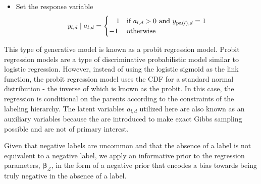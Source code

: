 \begin{enumerate}
\begin{itemize}
\begin{itemize}
\item Set the response variable \[
y_{l,d}\mid a_{l,d}=\begin{cases}
\ \ \ 1 & \text{if \ensuremath{a_{l,d}>0} and \ensuremath{y_{{\rm \mathrm{pa}}(l),d}=1}}\\
-1 & \text{otherwise}\end{cases}\]
 
\end{itemize}
\end{itemize}
\end{enumerate}
This type of generative model is known as a probit regression model.
Probit regression models are a type of discriminative probabilistic
model similar to logistic regression. However, instead of using the
logistic sigmoid as the link function, the probit regression model
uses the CDF for a standard normal distribution - the inverse of which
is known as the probit. In this case, the regression is conditional
on the parents according to the constraints of the labeling hierarchy.
The latent variables $a_{l,d}$ utilized here are also known as an
auxiliary variables because the are introduced to make exact Gibbs
sampling possible and are not of primary interest.

Given that negative labels are uncommon and that the absence of a
label is not equivalent to a negative label, we apply an informative
prior to the regression parameters, $\mathbf{\boldsymbol\beta}_{\mathcal{L}}$,
in the form of a negative prior that encodes a bias towards being
truly negative in the absence of a label.

